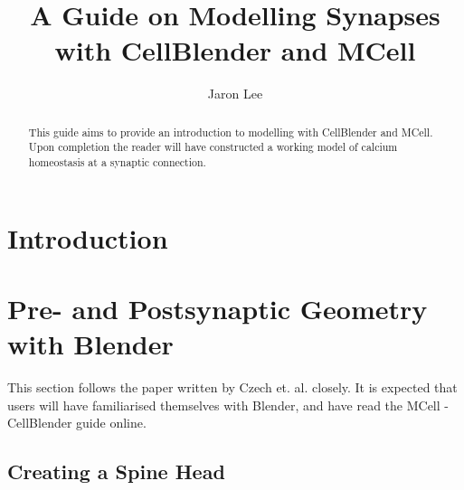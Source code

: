 \documentclass[twoside,a4paper]{refart}
\title{A Guide on Modelling Synapses with CellBlender and MCell}
\author{Jaron Lee}
\date{}
\begin{document}
\maketitle

\begin{abstract}
This guide aims to provide an introduction to modelling with CellBlender and MCell. Upon completion the reader will have constructed a working model of calcium homeostasis at a synaptic connection.
\end{abstract}

\newpage


\section{Introduction}


\section{Pre- and Postsynaptic Geometry with Blender}
This section follows the paper written by Czech et. al. closely. It is expected that users will have familiarised themselves with Blender, and have read the MCell - CellBlender guide online.

\subsection{Creating a Spine Head}
\end{document}

